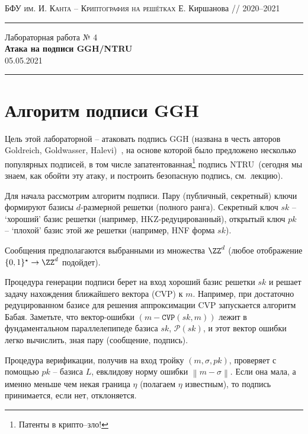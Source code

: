 \documentclass[11pt]{exam}
\theoremstyle{definition}
\newcommand*\norm[1]{\left\lVert#1\right\rVert}
\begin{document}
	{\noindent
		\textsc{БФУ им. И. Канта -- Криптография на решётках}
		\hfill {Е. Киршанова // 2020--2021\\}
\hrule
\begin{center}
	{\LARGE
			Лабораторная работа № 4 \\[5pt]
			\textbf{Атака на подписи GGH/NTRU} \\[10pt]
	 	{05.05.2021} 
 	} 
\end{center}
\hrule \vspace{5mm}
	
	\thispagestyle{empty}
	
	\vspace{0.2cm}
	\section{Алгоритм подписи GGH}
	
	Цель этой лабораторной -- атаковать подпись GGH (названа в честь авторов Goldreich, Goldwasser, Halevi)~\cite{GGH}, на основе которой было предложено несколько популярных подписей, в том числе запатентованная\footnote{Патенты в крипто--зло!} подпись NTRU~\cite{NTRUSign}(сегодня мы знаем, как обойти эту атаку, и построить безопасную подпись, см.\ лекцию).
	
	Для начала рассмотрим алгоритм подписи. Пару (публичный, секретный) ключи формируют базисы $d$-размерной решетки (полного ранга). Секретный ключ $sk$ -- `хороший' базис решетки (например, HKZ-редуцированный), открытый ключ $pk$ -- `плохой' базис этой же решетки (например, HNF форма $sk$).
	
	Сообщения предполагаются выбранными из множества $\ZZ^d$ (любое отображение $\{0,1\}^\star \rightarrow \ZZ^d$ подойдет).
	
	Процедура генерации подписи берет на вход хороший базис решетки $sk$ и решает задачу нахождения ближайшего вектора (CVP) к $m$. Например, при достаточно редуцированном базисе для решения аппроксимации CVP запускается алгоритм Бабая. Заметьте, что вектор-ошибки $(m - \mathtt{CVP}(sk, m))$ лежит в фундаментальном параллелепипеде базиса $sk$, $\mathcal{P}(sk)$, и этот вектор ошибки легко вычислить, зная пару (сообщение, подпись).
	
	Процедура верификации, получив на вход тройку $(m, \sigma, pk)$, проверяет с помощью $pk$ -- базиса $L$, евклидову норму ошибки $\norm{m - \sigma}$. Если она мала, а именно меньше чем некая граница $\eta$ (полагаем $\eta$ известным), то подпись принимается, если нет, отклоняется.
	
}
\end{document}
